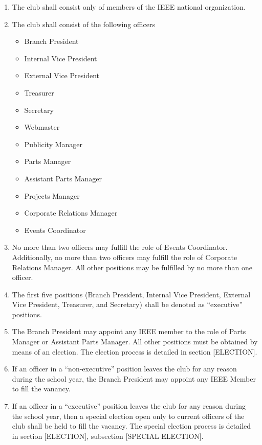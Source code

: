 \documentclass{article}
\begin{document}
\begin{enumerate}
\item The club shall consist only of members of the IEEE national organization.
\item The club shall consist of the following officers
  \begin{itemize}
    \item Branch President
    \item Internal Vice President
    \item External Vice President
    \item Treasurer
    \item Secretary
    \item Webmaster
    \item Publicity Manager
    \item Parts Manager 
    \item Assistant Parts Manager
    \item Projects Manager
    \item Corporate Relations Manager
    \item Events Coordinator
  \end{itemize}
\item No more than two officers may fulfill the role of Events Coordinator. Additionally, no more than two officers may fulfill the role of Corporate Relations Manager. All other positions may be fulfilled by no more than one officer.
\item The first five positions (Branch President, Internal Vice President, External Vice President, Treasurer, and Secretary) shall be denoted as ``executive'' positions. 
\item The Branch President may appoint any IEEE member to the role of Parts Manager or Assistant Parts Manager. All other positions must be obtained by means of an election. The election process is detailed in section [ELECTION].
\item If an officer in a ``non-executive'' position leaves the club for any reason during the school year, the Branch President may appoint any IEEE Member to fill the vanancy.
\item If an officer in a ``executive'' position leaves the club for any reason during the school year, then a special election open only to current officers of the club shall be held to fill the vacancy. The special election process is detailed in section [ELECTION], subsection [SPECIAL ELECTION].
\end{enumerate}
\end{document}

